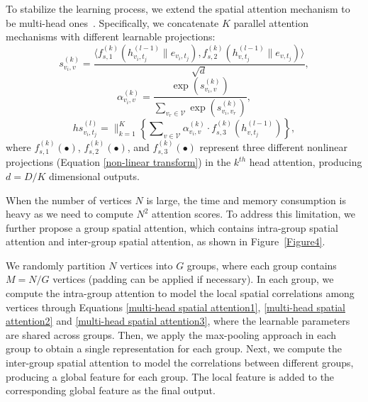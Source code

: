 \documentclass[letterpaper]{article} \usepackage{aaai20}  \usepackage{times}  \usepackage{helvet} \usepackage{courier}  \usepackage[hyphens]{url}  \usepackage{graphicx} \usepackage{amsmath}
\begin{document}
To stabilize the learning process, we extend the spatial attention mechanism to be multi-head ones~\cite{Vaswani-et-al:NIPS2017}. Specifically, we concatenate $ K $ parallel attention mechanisms with different learnable projections:
\begin{equation}
s_{v_i,v}^{(k)} = \dfrac{ \langle f^{(k)}_{s,1} (  h_{v_i,t_j}^{(l-1)} \parallel e_{v_i,t_j} ) , f^{(k)}_{s,2} ( h_{v,t_j}^{(l-1)} \parallel e_{v,t_j} ) \rangle }{\sqrt{d}}
\label{multi-head spatial attention1}, 
\end{equation}
\begin{equation}
\alpha_{v_i,v}^{(k)} = \dfrac{ \exp ( s_{v_i,v}^{(k)} ) }{ \sum_{v_r \in \mathcal{V}} \exp ( s_{v_i,v_r}^{(k)} ) }
\label{multi-head spatial attention2},
\end{equation}
\begin{equation}
hs_{v_i,t_j}^{(l)} = \parallel_{k = 1}^K \left\{ \sum\nolimits_{v \in \mathcal{V}} \alpha_{v_i,v}^{(k)} \cdot f^{(k)}_{s,3} ( h_{v,t_j}^{(l-1)} ) \right\}
\label{multi-head spatial attention3}, 
\end{equation}
where $ f^{(k)}_{s,1} ( \bullet ) $, $ f^{(k)}_{s,2} ( \bullet ) $, and $ f^{(k)}_{s,3} ( \bullet ) $ represent three different nonlinear projections (Equation \ref{non-linear transform}) in the $ k^{th} $ head attention, producing $ d = D / K $ dimensional outputs. 

When the number of vertices $ N $ is large, the time and memory consumption is heavy as we need to compute $ N^2 $ attention scores. To address this limitation, we further propose a group spatial attention, which contains intra-group spatial attention and inter-group spatial attention, as shown in Figure~\ref{Figure4}.

We randomly partition $ N $ vertices into $ G $ groups, where each group contains $ M=N/G $ vertices (padding can be applied if necessary). In each group, we compute the intra-group attention to model the local spatial correlations among vertices through Equations \ref{multi-head spatial attention1}, \ref{multi-head spatial attention2} and \ref{multi-head spatial attention3}, where the learnable parameters are shared across groups. Then, we apply the max-pooling approach in each group to obtain a single representation for each group. Next, we compute the inter-group spatial attention to model the correlations between different groups, producing a global feature for each group. The local feature is added to the corresponding global feature as the final output.
\end{document}
